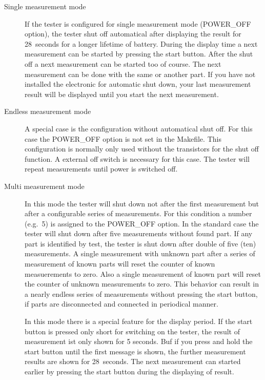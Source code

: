 \begin{description}
  \item[Single measurement mode] If the tester is configured for single measurement mode (POWER\_OFF option), the tester shut off automatical 
after displaying the result for 28~seconds for a longer lifetime of battery. 
During the display time a next measurement can be started by pressing the start button.
After the shut off a next measurement can be started too of course.
The next measurement can be done with the same or another part.
If you have not installed the electronic for automatic shut down, your
last measurement result will be displayed until you start the next measurement.

  \item[Endless measurement mode] A special case is the configuration without automatical shut off.
For this case the POWER\_OFF option is not set in the Makefile.
This configuration is normally only used without the transistors for the shut off function.
A external off switch is necessary for this case. The tester will repeat measurements until power
is switched off.

  \item[Multi measurement mode] In this mode the tester will shut down not after the first measurement but 
after a configurable series of measurements.
For this condition a number (e.g.~5) is assigned to the POWER\_OFF option.
In the standard case the tester will shut down after five
measurements without found part. If any part is identified by test, the tester is shut down after double of
five (ten) measurements. A single measurement with unknown part after a series of measurement of known parts will
reset the counter of known measuerements to zero. Also a single measurement of known part will reset the counter
of unknown measurements to zero. This behavior can result in a nearly endless series of measurements without
pressing the start button, if parts are disconnected and connected in periodical manner.

In this mode there is a special feature for the display period. If the start button is pressed only short for switching
on the tester, the result of measurement ist only shown for 5 seconds. Buf if you press and hold the start button until
the first message is shown, the further measurement results are shown for 28~seconds.
The next measurement can started earlier by pressing the start button during the displaying of result.

\end{description}

